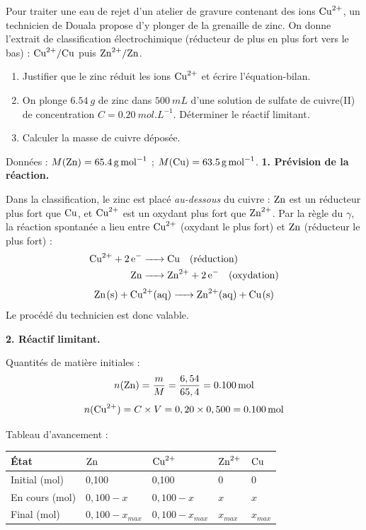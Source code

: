 \documentclass[11pt]{article}
\begin{document}
\begin{exoresolu}
Pour traiter une eau de rejet d'un atelier de gravure contenant des ions $\ce{Cu^2+}$, un technicien de Douala propose d'y plonger de la grenaille de zinc. On donne l'extrait de classification électrochimique (réducteur de plus en plus fort vers le bas) : $\ce{Cu^2+}/\ce{Cu}$ puis $\ce{Zn^2+}/\ce{Zn}$.
\begin{enumerate}
\item Justifier que le zinc réduit les ions $\ce{Cu^2+}$ et écrire l'équation-bilan.
\item On plonge $\SI{6,54}{g}$ de zinc dans $\SI{500}{mL}$ d'une solution de sulfate de cuivre(II) de concentration $C = \SI{0,20}{mol.L^{-1}}$. Déterminer le réactif limitant.
\item Calculer la masse de cuivre déposée.
\end{enumerate}
Données : $M(\ce{Zn}) = \SI{65,4}{g.mol^{-1}}$ ; $M(\ce{Cu}) = \SI{63,5}{g.mol^{-1}}$.
\tcblower
\textbf{1. Prévision de la réaction.}

Dans la classification, le zinc est placé \emph{au-dessous} du cuivre : $\ce{Zn}$ est un réducteur plus fort que $\ce{Cu}$, et $\ce{Cu^2+}$ est un oxydant plus fort que $\ce{Zn^2+}$. Par la règle du $\gamma$, la réaction spontanée a lieu entre $\ce{Cu^2+}$ (oxydant le plus fort) et $\ce{Zn}$ (réducteur le plus fort) :
\begin{align*}
\ce{Cu^2+ + 2e- &-> Cu} \quad \text{(réduction)}\\
\ce{Zn &-> Zn^2+ + 2e-} \quad \text{(oxydation)}
\end{align*}
\[ \ce{Zn(s) + Cu^2+(aq) -> Zn^2+(aq) + Cu(s)} \]
Le procédé du technicien est donc valable.

\textbf{2. Réactif limitant.}

Quantités de matière initiales :
\[ n(\ce{Zn}) = \frac{m}{M} = \frac{6,54}{65,4} = \SI{0,100}{mol} \]
\[ n(\ce{Cu^2+}) = C \times V = 0,20 \times 0,500 = \SI{0,100}{mol} \]

Tableau d'avancement :
\begin{center}
\begin{tabularx}{\linewidth}{|l|X|X|X|X|}
\hline
\rowcolor{popblueL} État & $\ce{Zn}$ & $\ce{Cu^2+}$ & $\ce{Zn^2+}$ & $\ce{Cu}$ \\
\hline
Initial (mol) & 0,100 & 0,100 & 0 & 0 \\
\hline
En cours (mol) & $0,100 - x$ & $0,100 - x$ & $x$ & $x$ \\
\hline
Final (mol) & $0,100 - x_{max}$ & $0,100 - x_{max}$ & $x_{max}$ & $x_{max}$ \\
\hline
\end{tabularx}
\end{center}


\end{exoresolu}
\end{document}
